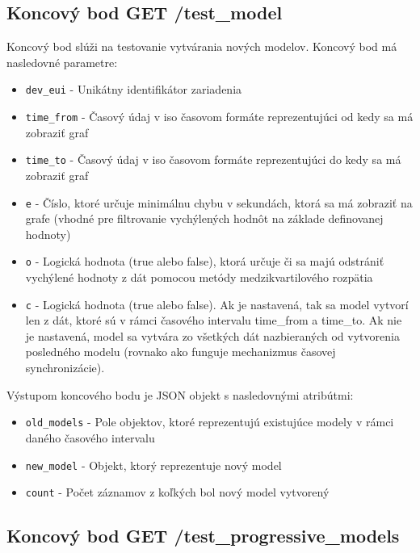 \subsection{Koncový bod GET /test_model}

Koncový bod slúži na testovanie vytvárania nových modelov. Koncový bod má nasledovné parametre:

\begin{itemize}
    \item \texttt{dev\_eui} - Unikátny identifikátor zariadenia
    \item \texttt{time\_from} - Časový údaj v iso časovom formáte reprezentujúci od kedy sa má zobraziť graf 
    \item \texttt{time\_to} - Časový údaj v iso časovom formáte reprezentujúci do kedy sa má zobraziť graf
    \item \texttt{e} - Číslo, ktoré určuje minimálnu chybu v sekundách, ktorá sa má zobraziť na grafe (vhodné pre filtrovanie vychýlených hodnôt na základe definovanej hodnoty)
    \item \texttt{o} - Logická hodnota (true alebo false), ktorá určuje či sa majú odstrániť vychýlené hodnoty z dát pomocou metódy medzikvartilového rozpätia
    \item \texttt{c} - Logická hodnota (true alebo false). Ak je nastavená, tak sa model vytvorí len z dát, ktoré sú v rámci časového intervalu time\_from a time\_to. Ak nie je nastavená, model sa vytvára zo všetkých dát nazbieraných od vytvorenia posledného modelu (rovnako ako funguje mechanizmus časovej synchronizácie). 
\end{itemize}

Výstupom koncového bodu je JSON objekt s nasledovnými atribútmi:

\begin{itemize}
    \item \texttt{old\_models} - Pole objektov, ktoré reprezentujú existujúce modely v rámci daného časového intervalu
    \item \texttt{new\_model} - Objekt, ktorý reprezentuje nový model
    \item \texttt{count} - Počet záznamov z koľkých bol nový model vytvorený
\end{itemize}


\subsection{Koncový bod GET /test_progressive_models}

